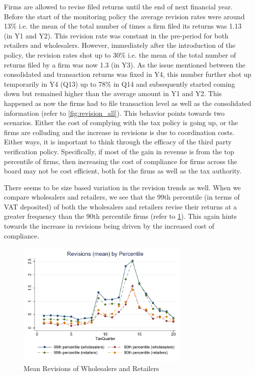 Firms are allowed to revise filed returns until the end of next financial year. Before the start of the monitoring policy the average revision rates were around 13\% i.e. the mean of the total number of times a firm filed its returns was 1.13 (in Y1 and Y2). This revision rate was constant in the pre-period for both retailers and
wholesalers. However, immediately after the introduction of the policy, the revision rates shot up to 30\% i.e. the mean of the total number of returns filed by a firm was now 1.3 (in Y3). As the issue mentioned between the consolidated and transaction returns was fixed in Y4, this number further shot up temporarily in Y4 (Q13) up to 78\% in Q14 and subsequently started coming down but remained higher than the average amount in Y1 and Y2.  This happened as now the firms had to file transaction level as well as the consolidated information (refer to \cref{fig:revision_all}). This behavior points towards two scenarios. Either the cost of complying with the tax policy is going up, or the firms are colluding and the increase in revisions is due to coordination costs. Either ways, it is important to think through the efficacy of the third party verification policy. Specifically, if most of the gain in revenue is from the top percentile of firms, then increasing the cost of compliance for firms across the board may not be cost efficient, both for the firms as well as the tax authority.

There seems to be size based variation in the revision trends as well. When we compare wholesalers and retailers, we see that the 99th percentile (in terms of VAT deposited) of both the wholesalers and retailers revise their returns at a greater frequency than the 90th percentile firms (refer to \cref{fig:revision_topdecile}). This again hints towards the increase in revisions being driven by the increased cost of compliance.

\begin{figure}[ht] 
\centering
\includegraphics[width=0.75\textwidth]{graphs/RevisionsWholesSalerVsRetailerTopPercentile.pdf}
\caption{Mean Revisions of Wholesalers and Retailers}
\label{fig:revision_topdecile}
\end{figure}


